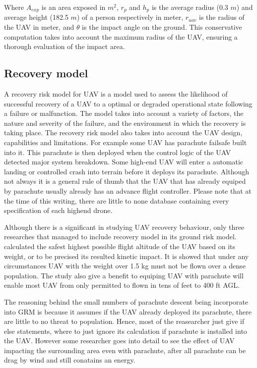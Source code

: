 \documentclass[12pt]{report}
\begin{document}
            Where \(A_{exp}\) is an area exposed in \(m^2 \), $r_p$ and \(h_p\) is the average radius (0.3 \(m\)) and
            average height (182.5 \(m\)) of a person respectively in meter, $r_{uav}$ is the radius of the UAV in meter,
            and $\theta$ is the impact angle on the ground. This conservative computation takes into account the maximum
            radius of the UAV, ensuring a thorough evaluation of the impact area.

        \subsection{Recovery model}
            A recovery risk model for UAV is a model used to assess the likelihood of successful recovery of a UAV to a
            optimal or degraded operational state following a failure or malfunction. The model takes into account a
            variety of factors, the nature and severity of the failure, and the environment in which the recovery is
            taking place. The recovery risk model also takes into account the UAV design, capabilities and limitations.
            For example some UAV has parachute failsafe built into it. This parachute is then deployed when the control
            logic of the UAV detected major system breakdown. Some high-end UAV will enter a automatic landing or
            controlled crash into terrain before it deploys its parachute. Although not always it is a general rule of
            thumb that the UAV that has already equiped by parachute usually already has an advance flight controller.
            Please note that at the time of this writing, there are little to none database containing every specification
            of each highend drone.
                
            Although there is a significant in studying UAV recovery behaviour, only three researches that managed to
            include recovery model in its ground risk model. \cite{shelley_model_2016} calculated the safest highest
            possible flight altitude of the UAV based on its weight, or to be precised its resulted kinetic impact. It
            is showed that under any circumstances UAV with the weight over 1.5 kg must not be flown over a dense
            population. The study also give a benefit to equiping UAV with parachute will enable most UAV from only
            permitted to flown in tens of feet to 400 ft \ac{AGL}.

            The reasoning behind the small numbers of parachute descent being incorporate into GRM is because it assumes
            if the UAV already deployed its parachute, there are little to no threat to population. Hence, most of the
            reasearcher just give if else statements, where to just ignore its calculation if parachute is installed
            into the UAV. However some researcher goes into detail to see the effect of UAV impacting the surrounding
            area even with parachute, after all parachute can be drag by wind and still conatains an energy.
\end{document}
